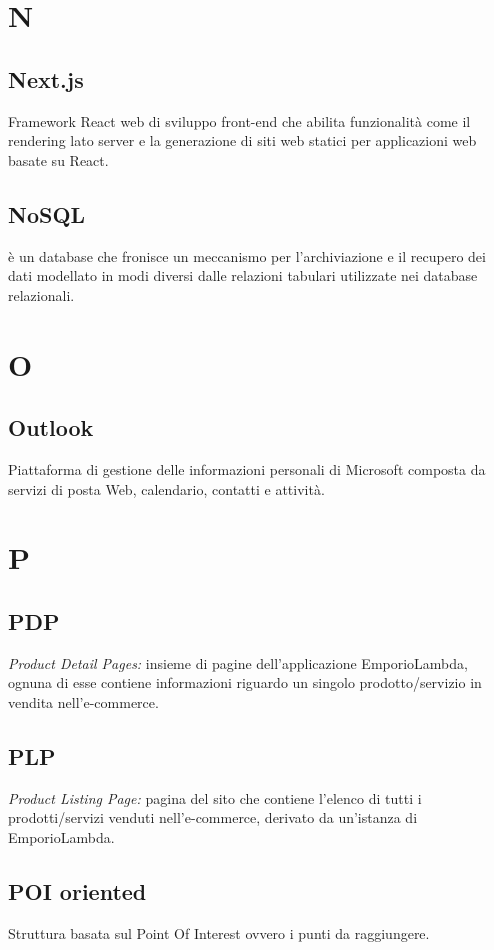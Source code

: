 \newpage
\section{N}
\subsection*{Next.js}
Framework React web di sviluppo front-end che abilita funzionalità come il rendering lato server e la generazione di siti web statici per applicazioni web basate su React.

\subsection*{NoSQL}
è un database che fronisce un meccanismo per l'archiviazione e il recupero dei dati modellato in modi diversi dalle relazioni tabulari utilizzate nei database relazionali.
\newpage
\section{O}
\subsection*{Outlook}
Piattaforma di gestione delle informazioni personali di Microsoft composta da servizi di posta Web, calendario, contatti e attività.

\newpage
\section{P}
\subsection*{PDP}
\textit{Product Detail Pages:} insieme di pagine dell'applicazione EmporioLambda, ognuna di esse contiene informazioni riguardo un singolo prodotto/servizio in vendita nell'e-commerce.

\subsection*{PLP}
\textit{Product Listing Page:} pagina del sito che contiene l'elenco di tutti i prodotti/servizi venduti nell'e-commerce, derivato da un'istanza di EmporioLambda.

\subsection*{POI oriented}
Struttura basata sul Point Of Interest ovvero i punti da raggiungere.

